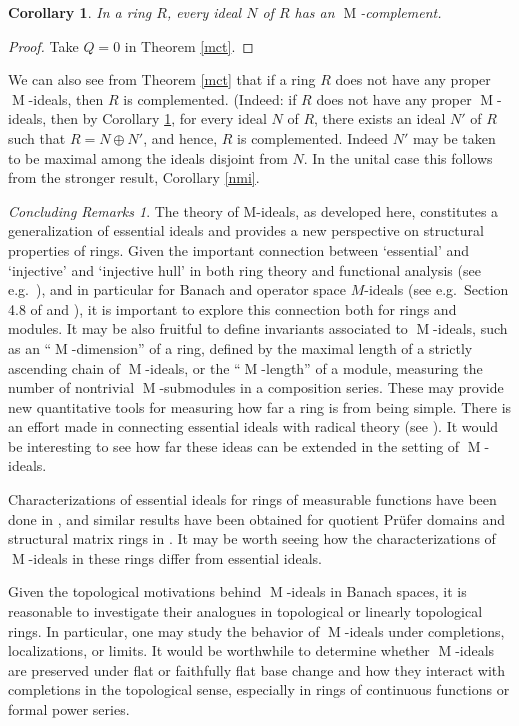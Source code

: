 \documentclass[11pt,leqno]{amsart}
\DeclareMathOperator{\m}{M}
\newtheorem{corollary}[theorem]{Corollary}
\theoremstyle{definition}
\theoremstyle{remark}
\newtheorem{cremark}[theorem]{Concluding Remarks}
\numberwithin{equation}{section}
\numberwithin{equation}{section}
\begin{document}
\begin{corollary}\label{lco}
In a ring $R$, 
every ideal
$N$ of  $R$ has an 
\( \m \)-complement. 
\end{corollary}

\begin{proof} 
Take $Q=0$ in Theorem \ref{mct}. 
\end{proof}



We can also see from Theorem \ref{mct} that 
if a ring $R$ does not have any proper $\m$-ideals, then $R$ is complemented. (Indeed: if $R$ does not have any proper $\m$-ideals, then by Corollary \ref{lco}, for every ideal $N$ of $R$, there exists an ideal $N'$ of $R$ such that $R=N\oplus N'$, and hence, $R$ is complemented.
Indeed $N'$ may be taken to be  maximal among the ideals disjoint from $N$.
 In the unital case this follows from the stronger result,
Corollary \ref{nmi}.     


\begin{cremark} The theory of M-ideals, as developed here, constitutes a generalization of essential ideals and provides a new perspective on structural properties of rings.
Given the important connection between `essential' and `injective' and `injective hull' in both ring theory and functional analysis (see e.g.\ \cite[Chapter 4]{BLM}), and in particular for Banach and operator space $M$-ideals (see e.g.\ Section 4.8 of \cite{BLM} and \cite{HWW93}), it is important to explore this connection both for rings and modules. It may be also fruitful to define invariants associated to $\m$-ideals, such as an ``$\m$-dimension'' of a ring, defined by the maximal length of a strictly ascending chain of $\m$-ideals, or the ``$\m$-length'' of a module, measuring the number of nontrivial $\m$-submodules in a composition series. These may provide new quantitative tools for measuring how far a ring is from being simple. 
There is an effort made in connecting essential ideals with radical theory (see \cite{OJ81, JR82, J85}). It would be interesting to see how far these ideas can be extended in the setting of  $\m$-ideals.

Characterizations of essential ideals for rings of measurable functions have been done in \cite{Mom10}, and similar results have been obtained for quotient Pr\"{u}fer domains and structural matrix rings in \cite{GW89}. It may be worth seeing how the characterizations of $\m$-ideals in these rings differ from essential ideals.

Given the topological motivations behind $\m$-ideals in Banach spaces, it is reasonable to investigate their analogues in topological or linearly topological rings. In particular, one may study the behavior of $\m$-ideals under completions, localizations, or limits. It would be worthwhile to determine whether $\m$-ideals are preserved under flat or faithfully flat base change and how they interact with completions in the topological sense, especially in rings of continuous functions or formal power series.
\end{cremark}
\end{document}
